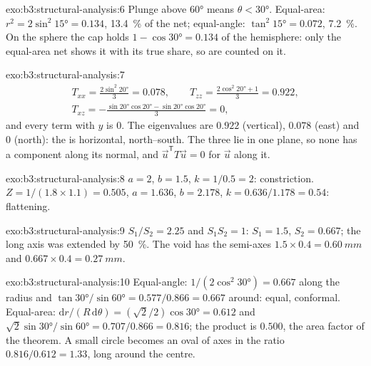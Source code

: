 \begin{solution}{exo:b3:structural-analysis:6}
Plunge above \ang{60} means $\theta < \ang{30}$. Equal-area: $r^2 =
2\sin^2\ang{15} = 0.134$, \qty{13.4}{\percent} of the net; equal-angle:
$\tan^2\ang{15} = 0.072$, \qty{7.2}{\percent}. On the sphere the cap holds
$1 - \cos\ang{30} = 0.134$ of the hemisphere: only the equal-area net shows
it with its true share, so  are counted on it.
\end{solution}

\begin{solution}{exo:b3:structural-analysis:7}
\begin{gather*}
  T_{xx} = \frac{2\sin^2\ang{20}}3 = 0.078,\qquad
  T_{zz} = \frac{2\cos^2\ang{20} + 1}3 = 0.922,\\
  T_{xz} = -\frac{\sin\ang{20}\cos\ang{20} - \sin\ang{20}\cos\ang{20}}3 = 0,
\end{gather*}
and every term with $y$ is 0. The eigenvalues are $0.922$ (vertical),
$0.078$ (east) and $0$ (north): the  is horizontal, north--south.
The three  lie in one plane, so none has a component along its normal,
and $\vec u^{\mathsf T}T\vec u = 0$ for $\vec u$ along it.
\end{solution}

\begin{solution}{exo:b3:structural-analysis:8}
$a = 2$, $b = 1.5$, $k = 1/0.5 = 2$: constriction. $Z = 1/(1.8\times1.1) =
0.505$, $a = 1.636$, $b = 2.178$, $k = 0.636/1.178 = 0.54$: flattening.
\end{solution}

\begin{solution}{exo:b3:structural-analysis:9}
$S_1/S_2 = 2.25$ and $S_1S_2 = 1$: $S_1 = 1.5$, $S_2 = 0.667$; the long axis
was extended by \qty{50}{\percent}. The void has the semi-axes $1.5\times0.4 =
\qty{0.60}{mm}$ and $0.667\times0.4 = \qty{0.27}{mm}$.
\end{solution}

\begin{solution}{exo:b3:structural-analysis:10}
Equal-angle: $1/(2\cos^2\ang{30}) = 0.667$ along the radius and
$\tan\ang{30}/\sin\ang{60} = 0.577/0.866 = 0.667$ around: equal, conformal.
Equal-area: $\mathrm dr/(R\,\mathrm d\theta) = (\sqrt2/2)\cos\ang{30} = 0.612$
and $\sqrt2\sin\ang{30}/\sin\ang{60} = 0.707/0.866 = 0.816$; the product is
$0.500$, the area factor of the theorem. A small circle becomes an oval of axes
in the ratio $0.816/0.612 = 1.33$, long around the centre.
\end{solution}

